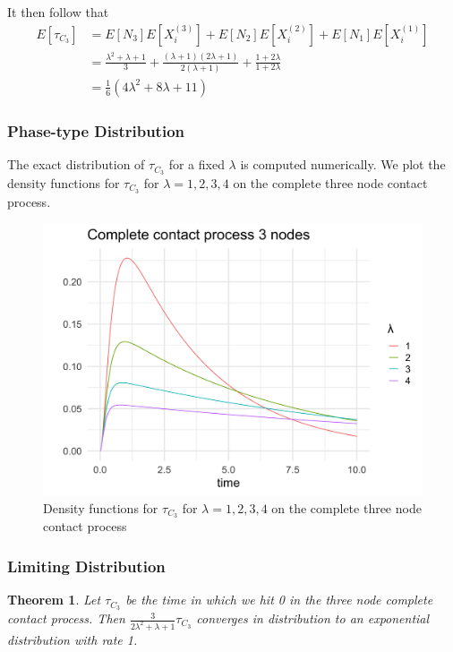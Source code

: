 \documentclass{article}
\theoremstyle{plain}
\newtheorem{theorem}{Theorem}[section]
\theoremstyle{definition}
\theoremstyle{remark}
\numberwithin{equation}{section}
\begin{document}
It then follow that
\begin{align*}
        E[\tau_{C_3}] &= E[N_3] E[X_i^{(3)}] + E[N_2] E[X_i^{(2)}] + E[N_1] E[X_i^{(1)}]\\
        &= \frac{\lambda^2 + \lambda + 1}{3} + \frac{(\lambda + 1)(2 \lambda + 1)}{2 (\lambda + 1)} + \frac{1 + 2\lambda}{1 + 2 \lambda}\\
        &= \frac{1}{6}(4 \lambda^2 + 8 \lambda + 11)
\end{align*}

\subsubsection{Phase-type Distribution}

The exact distribution of $\tau_{C_3}$ for a fixed $\lambda$ is computed numerically.
We plot the density functions for $\tau_{C_3}$ for $\lambda = 1, 2, 3, 4$ on the complete three node contact process.

\begin{figure}[H]
  \centering
    \includegraphics[width=.80\textwidth]{figures/complete_3_contact_phase_densities.png}
   \caption{Density functions for $\tau_{C_3}$ for $\lambda = 1, 2, 3, 4$ on the complete three node contact process}
  \label{fig:contact_3_phase_densities}
\end{figure}

\subsubsection{Limiting Distribution}

\begin{theorem}
Let $\tau_{C_3}$ be the time in which we hit 0 in the three node complete contact process.
Then $\frac{3}{2 \lambda^2 + \lambda + 1} \tau_{C_3}$ converges in distribution to an exponential distribution with rate 1.
\end{theorem}
\end{document}
